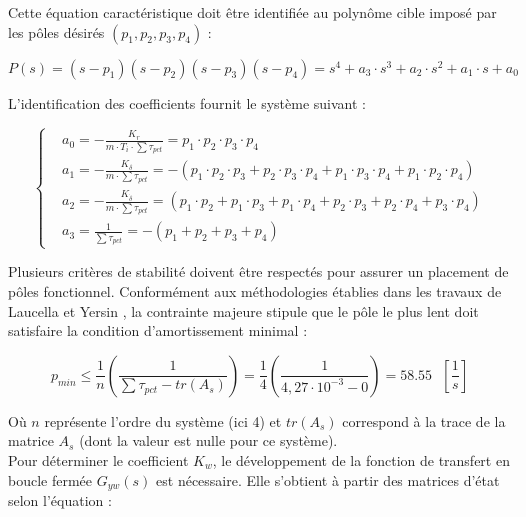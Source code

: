 Cette équation caractéristique doit être identifiée au polynôme cible imposé par les pôles désirés $(p_1, p_2, p_3, p_4)$ :

\begin{equation}
    P(s) = (s - p_1)(s - p_2)(s - p_3)(s - p_4) = s^4 + a_3 \cdot s^3 + a_2 \cdot s^2 + a_1 \cdot s + a_0
\end{equation}

L'identification des coefficients fournit le système suivant :

\begin{equation}
    \left\{
    \begin{aligned}
         & a_0 = -\displaystyle\frac{K_r}{m \cdot T_i \cdot \sum\tau_{pct}} = p_1 \cdot p_2 \cdot p_3 \cdot p_4
        \\
         & a_1 = -\displaystyle\frac{K_\delta}{m \cdot \sum\tau_{pct}} = -(p_1 \cdot p_2 \cdot p_3 + p_2 \cdot p_3 \cdot p_4 + p_1 \cdot p_3 \cdot p_4 + p_1 \cdot p_2 \cdot p_4)
        \\
         & a_2 = -\displaystyle\frac{K_{\dot{\delta}}}{m \cdot \sum\tau_{pct}} = (p_1 \cdot p_2 + p_1 \cdot p_3 + p_1 \cdot p_4 + p_2 \cdot p_3 + p_2 \cdot p_4 + p_3 \cdot p_4)
        \\
         & a_3 = \displaystyle\frac{1}{\sum\tau_{pct}} = -(p_1 + p_2 + p_3 + p_4)
    \end{aligned}
    \right.
\end{equation}

Plusieurs critères de stabilité doivent être respectés pour assurer un placement de pôles fonctionnel. Conformément aux méthodologies établies dans les travaux de Laucella \cite{Laucella} et Yersin \cite{Yersin}, la contrainte majeure stipule que le pôle le plus lent doit satisfaire la condition d'amortissement minimal :

\begin{equation}
    p_{min} \leq \frac{1}{n}\left( \frac{1}{\sum\tau_{pct} - tr\left(A_s\right)} \right) = \frac{1}{4}\left( \frac{1}{4,27\cdot 10^{-3} - 0} \right) = 58.55\text{ $[\frac{1}{s}]$}
\end{equation}

Où $n$ représente l'ordre du système (ici 4) et $tr\left(A_s\right)$ correspond à la trace de la matrice $A_s$ (dont la valeur est nulle pour ce système).\\

Pour déterminer le coefficient $K_w$, le développement de la fonction de transfert en boucle fermée $G_{yw}(s)$ est nécessaire. Elle s'obtient à partir des matrices d'état selon l'équation :


